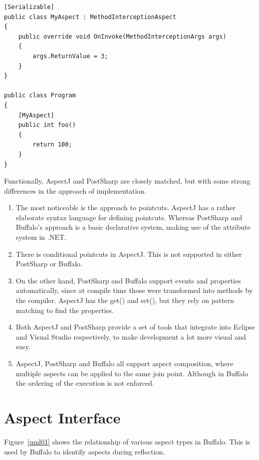 \begin{minipage}{\textwidth}
\begin{lstlisting}[caption={PostSharp MethodInterceptionAspect}, label=postsharpintercept]
[Serializable]
public class MyAspect : MethodInterceptionAspect
{
    public override void OnInvoke(MethodInterceptionArgs args)
    {
        args.ReturnValue = 3;
    }
}

public class Program
{
    [MyAspect]
    public int foo()
    {
        return 100;
    }
}
\end{lstlisting}
\end{minipage}

Functionally, AspectJ and PostSharp are closely matched, but with some strong differences in the approach of implementation.

\begin{enumerate}
	\item The most noticeable is the approach to pointcuts. AspectJ has a rather elaborate syntax language for defining pointcuts. Whereas PostSharp and Buffalo’s approach is a basic declarative system, making use of the attribute system in .NET.

	\item There is conditional pointcuts in AspectJ. This is not supported in either PostSharp or Buffalo.

	\item On the other hand, PostSharp and Buffalo support events and properties automatically, since at compile time those were transformed into methods by the compiler. AspectJ has the get() and set(), but they rely on pattern matching to find the properties.

	\item Both AspectJ and PostSharp provide a set of tools that integrate into Eclipse and Visual Studio respectively, to make development a lot more visual and easy.

	\item AspectJ, PostSharp and Buffalo all support aspect composition, where multiple aspects can be applied to the same join point. Although in Buffalo the ordering of the execution is not enforced.

\end{enumerate}


\section{Aspect Interface}

Figure~\ref{uml01} shows the relationship of various aspect types in Buffalo. This is used by Buffalo to identify aspects during reflection.


